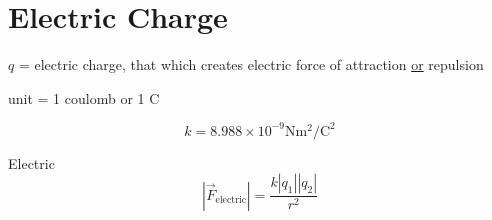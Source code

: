 \documentclass[fleqn]{article}
\begin{document}
\setlength{\mathindent}{0pt}
\section*{Electric Charge}
$q$ = electric charge, that which creates electric force of attraction \underline{or} repulsion

unit = 1 coulomb or 1 C

\[ k = 8.988 \times 10^{-9} \text{N}  \text{m}^2/\text{C}^2   \]

Electric
\[ |\vec{F}_{\text{electric} } | = \frac{k|q_1||q_2|}{r^2} \]
\end{document}
